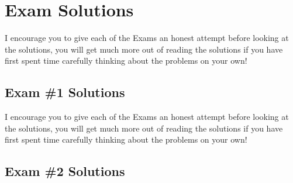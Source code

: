 \renewcommand{\thechapter}{ES}
\chapter*{Exam Solutions}
\addtocounter{chapter}{1} %
\setcounter{section}{0}

\vspace{-0.3in}
\begin{tcolorbox}
    I encourage you to give each of the Exams an honest attempt before looking at the solutions, you will get much more out of reading the solutions if you have first spent time carefully thinking about the problems on your own!
\end{tcolorbox}
\vspace{-0.2in}
\section{Exam \#1 Solutions}

\newpage

\begin{tcolorbox}
    I encourage you to give each of the Exams an honest attempt before looking at the solutions, you will get much more out of reading the solutions if you have first spent time carefully thinking about the problems on your own!
\end{tcolorbox}
\vspace{-0.2in}
\section{Exam \#2 Solutions}